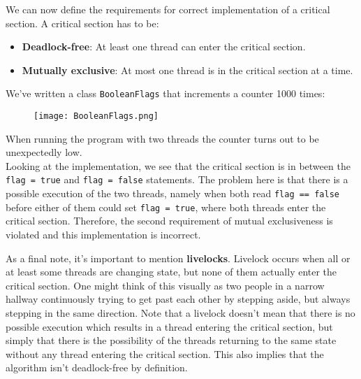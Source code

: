 \documentclass[main]{subfiles}
\begin{document}
\noindent We can now define the requirements for correct implementation of a critical section. A critical section has to be:
\begin{itemize}
    \item \textbf{Deadlock-free}: At least one thread can enter the critical section.
    \item \textbf{Mutually exclusive}: At most one thread is in the critical section at a time.
\end{itemize}

\begin{example}
    We've written a class \texttt{BooleanFlags} that increments a counter 1000 times:
    \begin{figure}[H]
        \centering
        \texttt{[image: BooleanFlags.png]}
    \end{figure}
    \noindent When running the program with two threads the counter turns out to be unexpectedly low.\\[3mm]
    Looking at the implementation, we see that the critical section is in between the \texttt{flag = true} and \texttt{flag = false} statements. The problem here is that there is a possible execution of the two threads, namely when both read \texttt{flag == false} before either of them could set \texttt{flag = true}, where both threads enter the critical section. Therefore, the second requirement of mutual exclusiveness is violated and this implementation is incorrect. 
\end{example}

\noindent As a final note, it's important to mention \textbf{livelocks}. Livelock occurs when all or at least some threads are changing state, but none of them actually enter the critical section. One might think of this visually as two people in a narrow hallway continuously trying to get past each other by stepping aside, but always stepping in the same direction. Note that a livelock doesn't mean that there is no possible execution which results in a thread entering the critical section, but simply that there is the possibility of the threads returning to the same state without any thread entering the critical section. This also implies that the algorithm isn't deadlock-free by definition.\\

\end{document}

